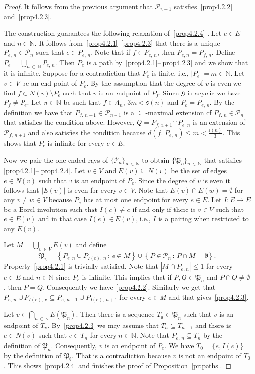 \documentclass[10pt]{amsart}
\theoremstyle{definition}
\newcommand{\clG}{\mathcal{G}}
\newcommand{\clP}{\mathcal{P}}
\newcommand{\bbZ}{\mathbb{N}}
\newcommand{\frkP}{\mathfrak{P}}
\newcommand{\frks}{\mathfrak{s}}
\begin{document}
\begin{proof}
It follows from the previous argument that $\clP_{n+1}$ satisfies~\eqref{prop4.2.2} and~\eqref{prop4.2.3}.

The construction guarantees the following relaxation of~\eqref{prop4.2.4} . Let $e\in E$ and $n\in \bbZ$. It follows from~\eqref{prop4.2.1}--\eqref{prop4.2.3} that there is a unique $P_{e,\,n}\in \clP_n$ such that $e\in P_{e,\,n}$. Note that if $f\in P_{e,\,n}$, then $P_{e,\,n}=P_{f,\,n}$. Define $P_e=\bigcup_{n\,\in\,\bbZ} P_{e,\,n}$. Then $P_e$ is a path by~\eqref{prop4.2.1}--\eqref{prop4.2.3} and we show that it is infinite. Suppose for a contradiction that $P_e$ is finite, i.e., $|P_e|=m\in \bbZ$. Let $v\in V$ be an end point of $P_e$. By the assumption that the degree of $v$ is even we find $f\in N(v)\setminus P_e$ such that $v$ is an endpoint of $P_f$. Since $\clG$ is acyclic we have $P_f\not=P_e$. Let $n\in \bbZ$ be such that $f\in A_n$, $3m<\frks(n)$ and $P_e=P_{e,\,n}$. By the definition we have that $P_{f,\,n+1}\in \clP_{n+1}$ is a $\subseteq$-maximal extension of $P_{f,\,n}\in \clP_n$ that satisfies the condition above. However, $Q={P_{f,\,n+1}}^\frown P_{e,\,n}$ is an extension of $\clP_{f,\,n+1}$ and also satisfies the condition because $d(f,\,P_{e,\,n})\le m<\frac{\frks(n)}{3}$. This shows that $P_e$ is infinite for every $e\in E$.

Now we pair the one ended rays of $\{\clP_n\}_{n\,\in\,\bbZ}$ to obtain $\{\frkP_n\}_{n\,\in\,\bbZ}$ that satisfies \eqref{prop4.2.1}--\eqref{prop4.2.4}. Let $v\in V$ and $E(v)\subseteq N(v)$ be the set of edges $e\in N(v)$ such that $v$ is an endpoint of $P_e$. Since the degree of $v$ is even it follows that $|E(v)|$ is even for every $v\in V$. Note that $E(v)\cap E(w)=\emptyset$ for any $v\not=w \in V$ because $P_e$ has at most one endpoint for every $e\in E$. Let $I:E\to E$ be a Borel involution such that $I(e)\not =e$ if and only if there is $v\in V$ such that $e\in E(v)$ and in that case $I(e)\in E(v)$, i.e., $I$ is a pairing when restricted to any $E(v)$.

Let $M=\bigcup_{v\,\in\,V} E(v)$ and define
\[
\frkP_n=\left\{P_{e,\,n}\cup P_{I(e),\,n}\,:\,e\in M\right\}\cup \left\{P\in \clP_n\,:\,P\cap M=\emptyset\right\}.
\]
Property~\eqref{prop4.2.1} is trivially satisfied. Note that $|M\cap P_{e,\,n}|\le 1$ for every $e\in E$ and $n\in \bbZ$ since $P_e$ is infinite. This implies that if $P,Q\in \frkP_n$ and $P\cap Q\not=\emptyset$, then $P=Q$. Consequently we have~\eqref{prop4.2.2}. Similarly we get that $P_{e,\,n}\cup P_{I(e),\,n}\subseteq P_{e,\,n+1}\cup P_{I(e),\,n+1}$ for every $e\in M$ and that gives~\eqref{prop4.2.3}.

Let $v\in \bigcap_{n\,\in\,\bbZ}E(\frkP_n)$. Then there is a sequence $T_n\in \frkP_n$ such that $v$ is an endpoint of $T_n$. By~\eqref{prop4.2.3} we may assume that $T_n\subseteq T_{n+1}$ and there is $e\in N(v)$ such that $e\in T_n$ for every $n\in \bbZ$. Note that $P_{e,\,n}\subseteq T_n$ by the definition of $\frkP_n$. Consequently, $v$ is an endpoint of $P_e$. We have $T_0=\{e,I(e)\}$ by the definition of $\frkP_0$. That is a contradiction because $v$ is not an endpoint of $T_0$. This shows~\eqref{prop4.2.4} and finishes the proof of Proposition~\ref{pr:paths}.
\end{proof}
\end{document}
